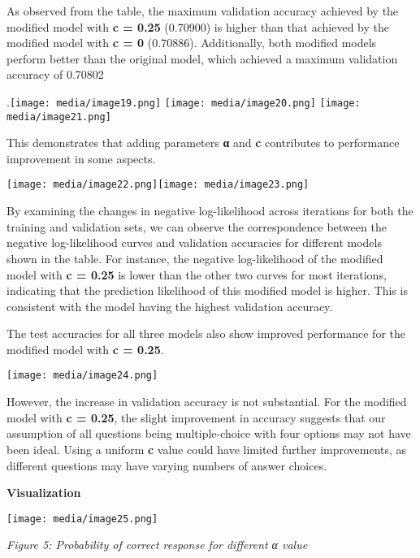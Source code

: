 As observed from the table, the maximum validation accuracy achieved by
the modified model with \textbf{c = 0.25} (0.70900) is higher than that
achieved by the modified model with \textbf{c = 0} (0.70886).
Additionally, both modified models perform better than the original
model, which achieved a maximum validation accuracy of 0.70802

.\texttt{[image: media/image19.png]}
\texttt{[image: media/image20.png]}
\texttt{[image: media/image21.png]}

This demonstrates that adding parameters \textbf{α} and \textbf{c}
contributes to performance improvement in some aspects.~

\texttt{[image: media/image22.png]}\texttt{[image: media/image23.png]}

By examining the changes in negative log-likelihood across iterations
for both the training and validation sets, we can observe the
correspondence between the negative log-likelihood curves and validation
accuracies for different models shown in the table. For instance, the
negative log-likelihood of the modified model with \textbf{c = 0.25} is
lower than the other two curves for most iterations, indicating that the
prediction likelihood of this modified model is higher. This is
consistent with the model having the highest validation accuracy.

The test accuracies for all three models also show improved performance
for the modified model with \textbf{c = 0.25}.~

\texttt{[image: media/image24.png]}

However, the increase in validation accuracy is not substantial. For the
modified model with \textbf{c = 0.25}, the slight improvement in
accuracy suggests that our assumption of all questions being
multiple-choice with four options may not have been ideal. Using a
uniform \textbf{c} value could have limited further improvements, as
different questions may have varying numbers of answer choices.

\textbf{Visualization}

\texttt{[image: media/image25.png]}

\emph{Figure 5: Probability of correct response for different α value}

\textbf{\hfill\break
}

